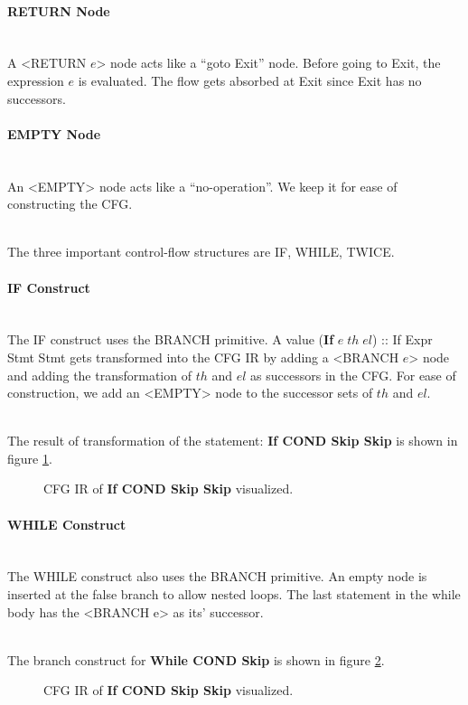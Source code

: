 \documentclass[a4paper]{article}
\newcommand{\NL}[0]{ \hfill\\\noindent }
\begin{document}
\paragraph{RETURN Node}\NL
A <RETURN $e$> node acts like a ``goto Exit'' node. Before going to Exit, the expression $e$ is evaluated. The flow gets absorbed at Exit since Exit has no successors.

\paragraph{EMPTY Node}\NL
An <EMPTY> node acts like a ``no-operation''. We keep it for ease of constructing the CFG.

\NL The three important control-flow structures are IF, WHILE, TWICE. 

\paragraph{IF Construct}\NL
The IF construct uses the BRANCH primitive. A value (\textbf{If} $e\;th\;el$) :: If Expr Stmt Stmt gets transformed into the CFG IR by adding a <BRANCH $e$> node and adding the transformation of $th$ and $el$ as successors in the CFG. 
For ease of construction, we add an <EMPTY> node to the successor sets of $th$ and $el$.

\NL The result of transformation of the statement: \textbf{If COND Skip Skip} is shown in figure \ref{ifflow}.
\begin{figure}[ht!]
\centering	
\scalebox{.7}{}
\caption{ CFG IR of \textbf{If COND Skip Skip} visualized. }
\label{ifflow}
\end{figure}

\paragraph{WHILE Construct}\NL
The WHILE construct also uses the BRANCH primitive. An empty node is inserted at the false branch to allow nested loops. The last statement in the while body has the <BRANCH e> as its' successor. 

\NL
The branch construct for \textbf{While COND Skip} is shown in figure \ref{whileflow}.

\begin{figure}[ht!]
	\centering	
	\scalebox{.7}{}
	\caption{ CFG IR of \textbf{If COND Skip Skip} visualized. }
	\label{whileflow}
\end{figure}
\end{document}
